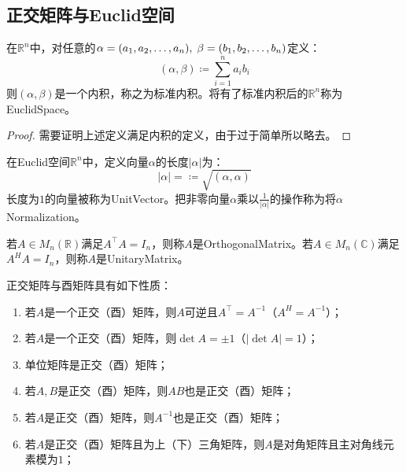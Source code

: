 \subsection{正交矩阵与Euclid空间}
\begin{definition}
	在$\mathbb{R}^{n}$中，对任意的$\alpha=(a_1, a_2, \dots, a_{n}),\;\beta=(b_1, b_2, \dots, b_{n})$定义：
	\begin{equation*}
		(\alpha,\beta)\coloneq\sum_{i=1}^{n}a_ib_i
	\end{equation*}
	则$(\alpha,\beta)$是一个内积，称之为标准内积。将有了标准内积后的$\mathbb{R}^{n}$称为\gls{EuclidSpace}。
\end{definition}
\begin{proof}
	需要证明上述定义满足内积的定义，由于过于简单所以略去。
\end{proof}
\begin{definition}
	在Euclid空间$\mathbb{R}^{n}$中，定义向量$\alpha$的长度$|\alpha|$为：
	\begin{equation*}
		|\alpha|=\coloneq\sqrt{(\alpha,\alpha)}
	\end{equation*}
	长度为$1$的向量被称为\gls{UnitVector}。把非零向量$\alpha$乘以$\frac{1}{|\alpha|}$的操作称为将$\alpha$\gls{Normalization}。
\end{definition}
\begin{definition}
	若$A\in M_{n}(\mathbb{R})$满足$A^{\top}A=I_n$，则称$A$是\gls{OrthogonalMatrix}。若$A\in M_{n}(\mathbb{C})$满足$A^HA=I_n$，则称$A$是\gls{UnitaryMatrix}。
\end{definition}
\begin{property}\label{prop:OrthogonalUnitaryMatrix}
	正交矩阵与酉矩阵具有如下性质：
	\begin{enumerate}
		\item 若$A$是一个正交（酉）矩阵，则$A$可逆且$A^{\top}=A^{-1}$（$A^H=A^{-1}$）；
		\item 若$A$是一个正交（酉）矩阵，则$\det A=\pm1$（$|\det A|=1$）；
		\item 单位矩阵是正交（酉）矩阵；
		\item 若$A,B$是正交（酉）矩阵，则$AB$也是正交（酉）矩阵；
		\item 若$A$是正交（酉）矩阵，则$A^{-1}$也是正交（酉）矩阵；
		\item 若$A$是正交（酉）矩阵且为上（下）三角矩阵，则$A$是对角矩阵且主对角线元素模为$1$；
	\end{enumerate}
\end{property}
